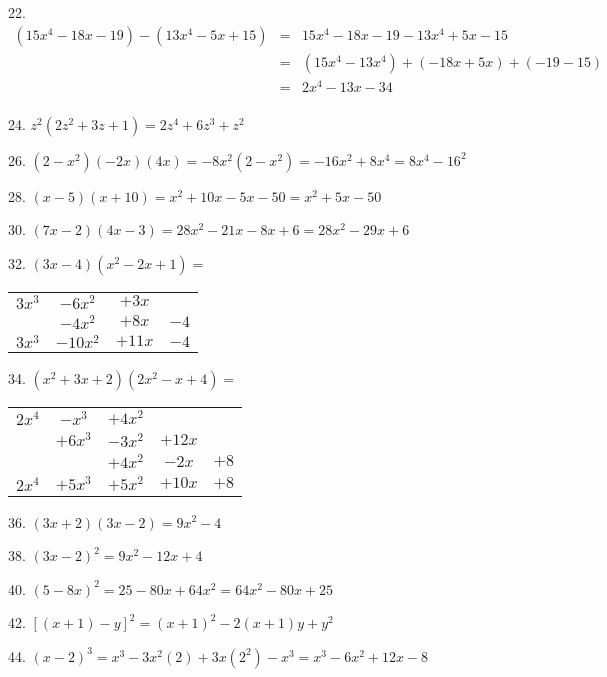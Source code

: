 \documentclass[letterpaper]{article}
\begin{document}
22.
\begin{eqnarray*}
(15x^4-18x-19)-(13x^4-5x+15) &=& 15x^4-18x-19-13x^4+5x-15 \\
                            &=& (15x^4-13x^4)+(-18x+5x)+(-19-15) \\
                            &=& 2x^4-13x-34 \\
\end{eqnarray*}

24. $z^2(2z^2+3z+1)=2z^4+6z^3+z^2$

\bigskip

26. $(2-x^2)(-2x)(4x)=-8x^2(2-x^2)=-16x^2+8x^4=8x^4-16^2$

\bigskip

28. $(x-5)(x+10)=x^2+10x-5x-50=x^2+5x-50$

\bigskip

30. $(7x-2)(4x-3)=28x^2-21x-8x+6=28x^2-29x+6$

\bigskip

32. $(3x-4)(x^2-2x+1)=$
\begin{tabular}{cccc}
$3x^3$ & $-6x^2$ & $+3x$ & \\
     & $-4x^2$ & $+8x$ & $-4$ \\
\hline
$3x^3$ & $-10x^2$ & $+11x$ & $-4$ \\
\end{tabular}

\bigskip

34. $(x^2+3x+2)(2x^2-x+4)=$
\begin{tabular}{ccccc}
$2x^4$ & $-x^3$ & $+4x^2$ & & \\
       & $+6x^3$ & $-3x^2$ & $+12x$ & \\
       &         & $+4x^2$ & $-2x$ & $+8$ \\
\hline
$2x^4$ & $+5x^3$ & $+5x^2$ & $+10x$ & $+8$ \\
\end{tabular}

\bigskip

36. $(3x+2)(3x-2)=9x^2-4$

\bigskip

38. $(3x-2)^2=9x^2-12x+4$

\bigskip

40. $(5-8x)^2=25-80x+64x^2=64x^2-80x+25$

\bigskip

42. $[(x+1)-y]^2=(x+1)^2-2(x+1)y+y^2$

\bigskip

44. $(x-2)^3=x^3-3x^2(2)+3x(2^2)-x^3=x^3-6x^2+12x-8$
\end{document}
